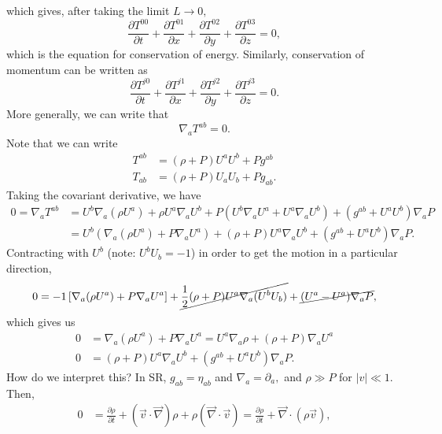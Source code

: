 \documentclass{article}
\numberwithin{equation}{section}
\begin{document}
which gives, after taking the limit $L\to 0,$
\begin{equation}
    \frac{\partial T^{00}}{\partial t} + \frac{\partial T^{01}}{\partial x} + \frac{\partial T^{02}}{\partial y} + \frac{\partial T^{03}}{\partial z} = 0,
\end{equation}
which is the equation for conservation of energy. Similarly, conservation of momentum can be written as 
\begin{equation}
    \frac{\partial T^{j0}}{\partial t} + \frac{\partial T^{j1}}{\partial x} + \frac{\partial T^{j2}}{\partial y} + \frac{\partial T^{j3}}{\partial z} = 0.
\end{equation}
More generally, we can write that 
\begin{equation*}
    \nabla_a T^{ab} = 0.
\end{equation*}
Note that we can write 
\begin{align*}
    T^{ab} &= (\rho + P)U^aU^b + Pg^{ab} \\ 
    T_{ab} &= (\rho+P)U_aU_b + Pg_{ab}.
\end{align*}
Taking the covariant derivative, we have 
\begin{align*}
    0 = \nabla_a T^{ab} &= U^b\nabla_a(\rho U^a) + \rho U^a \nabla_a U^b + P\left(U^b \nabla_a U^a + U^a\nabla_a U^b\right) + (g^{ab} + U^aU^b)\nabla_aP \\ 
    &= U^b\left(\nabla_a(\rho U^a) + P\nabla_a U^a\right) + (\rho+P)U^a \nabla_a U^b + (g^{ab}+U^aU^b)\nabla_a P.
\end{align*}
Contracting with $U^b$ (note: $U^bU_b = -1$) in order to get the motion in a particular direction, 
\begin{align*}
    0 = -1\left[\nabla_a(\rho U^a) + P\nabla_a U^a\right] + \cancel{\frac{1}{2}(\rho+P)U^a\nabla_a(U^bU_b)} + \cancel{(U^a-U^a)\nabla_a P},
\end{align*}
which gives us 
\begin{align*}
    0 &= \nabla_a(\rho U^a) + P\nabla_a U^a = U^a\nabla_a\rho + (\rho+P)\nabla_aU^a\\ 
    0 &= (\rho+P)U^a \nabla_a U^b + (g^{ab}+U^aU^b)\nabla_a P.
\end{align*}
How do we interpret this? In SR, $g_{ab}=\eta_{ab}$ and $\nabla_a = \partial_a,$ and $\rho \gg P$ for $|v| \ll 1.$ Then,
\begin{align*}
    0 &= \frac{\partial \rho}{\partial t} + (\vec{v}\cdot \vec{\nabla})\rho + \rho\left(\vec{\nabla} \cdot \vec{v}\right) = \frac{\partial \rho}{\partial t} + \vec{\nabla} \cdot \left(\rho \vec{v}\right),
\end{align*}
\end{document}
